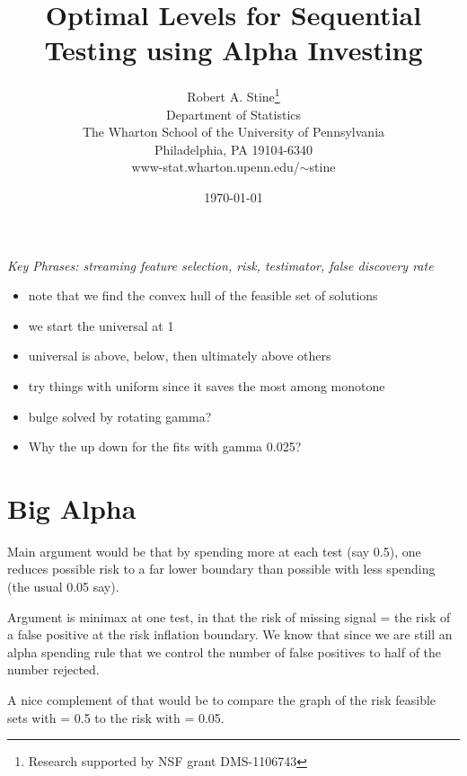 \documentclass[12pt]{article}
\title{ Optimal Levels for Sequential Testing using Alpha Investing }
\author{
        Robert A. Stine\thanks{Research supported by NSF grant DMS-1106743 }  \\
        Department of Statistics            \\
        The Wharton School of the University of Pennsylvania \\
        Philadelphia, PA 19104-6340                          \\
        www-stat.wharton.upenn.edu/$\sim$stine 
}
\date{\today}
\begin{document}
\maketitle 

\abstract{ 

  

}

\vspace{0.05in}

\noindent
{\it Key Phrases: streaming feature selection, risk, testimator, false discovery rate}

\begin{itemize}
  \item note that we find the convex hull of the feasible set of solutions
  \item we start the universal at 1
  \item universal is above, below, then ultimately above others
  \item try things with uniform since it saves the most among monotone
  \item bulge solved by rotating gamma?
  \item Why the up down for the fits with gamma 0.025?
\end{itemize}

\clearpage


\section{Big Alpha}

Main argument would be that by spending more at each test (say 0.5), one reduces
possible risk to a far lower boundary than possible with less spending (the
usual 0.05 say).  

Argument is minimax at one test, in that the risk of missing signal = the risk
of a false positive at the risk inflation boundary.  We know that since we are
still an alpha spending rule that we control the number of false positives to
half of the number rejected.

A nice complement of that would be to compare the graph of the risk feasible
 sets with \omega = 0.5 to the risk with \omega = 0.05.


\end{document}
